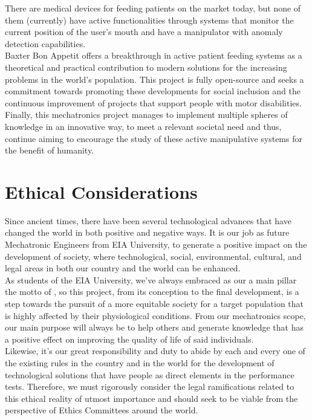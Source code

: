 \documentclass[11pt]{report} %
\begin{document}
There are medical devices for feeding patients on the market today, but none of them (currently) have active functionalities through systems that monitor the current position of the user's mouth and have a manipulator with anomaly detection capabilities.\\

Baxter Bon Appetit offers a breakthrough in active patient feeding systems as a theoretical and practical contribution to modern solutions for the increasing problems in the world's population. This project is fully open-source and seeks a commitment towards promoting these developments for social inclusion and the continuous improvement of projects that support people with motor disabilities.\\

Finally, this mechatronics project manages to implement multiple spheres of knowledge in an innovative way, to meet a relevant societal need and thus, continue aiming to encourage the study of these active manipulative systems for the benefit of humanity.\\

\chapter{Ethical Considerations}

Since ancient times, there have been several technological advances that have changed the world in both positive and negative ways. It is our job as future Mechatronic Engineers from EIA University, to generate a positive impact on the development of society, where technological, social, environmental, cultural, and legal areas in both our country and the world can be enhanced.\\

As students of the EIA University, we've always embraced as our a main pillar the motto of , so this project, from its conception to the final development, is a step towards the pursuit of a more equitable society for a target population that is highly affected by their physiological conditions. From our mechatronics scope, our main purpose will always be to help others and generate knowledge that has a positive effect on improving the quality of life of said individuals.\\

Likewise, it's our great responsibility and duty to abide by each and every one of the existing rules in the country and in the world for the development of technological solutions that have people as direct elements in the performance tests. Therefore, we must rigorously consider the legal ramifications related to this ethical reality of utmost importance and should seek to be viable from the perspective of Ethics Committees around the world.\\
\end{document}
